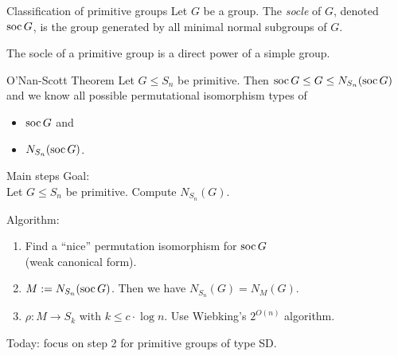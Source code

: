 \documentclass{beamer}
\theoremstyle{plain}
\theoremstyle{definition}
\begin{document}

\begin{frame}{Classification of primitive groups}
Let $G$ be a group. The \emph{socle} of $G$, denoted $\operatorname{soc} G$,
is the group generated by all minimal normal subgroups of $G$.

The socle of a primitive group is a direct power of a simple group.
\pause
\begin{block}{O'Nan-Scott Theorem}
    Let $G \leq S_n$ be primitive.
    Then $\operatorname{soc} G \leq G \leq N_{S_n}(\operatorname{soc} G)$
    and we know all possible permutational isomorphism types of
    \vspace{-0.5em}
    \begin{itemize}
        \item
        $\operatorname{soc} G$ and
        \item
        $N_{S_n}(\operatorname{soc} G)$.
    \end{itemize}
\end{block}
\end{frame}


\begin{frame}{Main steps}
Goal:
\\
Let $G \leq S_n$ be primitive.
Compute $N_{S_n}(G)$.

Algorithm:
\begin{enumerate}
\item Find a ``nice'' permutation isomorphism for $\operatorname{soc} G$
\\
(weak canonical form).

\item $M := N_{S_n}(\operatorname{soc} G)$.
Then we have $N_{S_n}(G) = N_M(G)$.

\item
$
    \rho : M \to S_k
$
with $k \leq c \cdot \log n$.
Use Wiebking's $2 ^ {O(n)}$ algorithm.
\end{enumerate}
\vspace{1em}

\pause
Today: focus on step 2 for primitive groups of type SD.
\end{frame}

\end{document}
